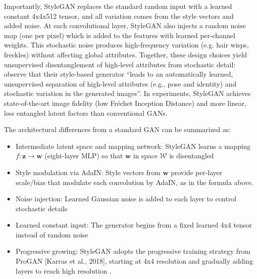 Importantly, StyleGAN replaces the standard random input with a learned constant 4x4x512 tensor, and all variation comes from the style vectors and added noise. 
At each convolutional layer, StyleGAN also injects a random noise map (one per pixel) which is added to the features with learned per-channel weights.
This stochastic noise produces high-frequency variation (e.g. hair wisps, freckles) without affecting global attributes. 
Together, these design choices yield unsupervised disentanglement of high-level attributes from stochastic detail: \citet{karras2019stylebasedgeneratorarchitecturegenerative} observe that their style-based generator 
“leads to an automatically learned, unsupervised separation of high-level attributes (e.g., pose and identity) and stochastic variation in the generated images”.
In experiments, StyleGAN achieves state-of-the-art image fidelity (low Fréchet Inception Distance) and more linear, less entangled latent factors than conventional GANs.


The architectural differences from a standard GAN can be summarized as:

\begin{itemize}
  \item Intermediate latent space and mapping network: StyleGAN learns a mapping $f: \mathbf{z}\to \mathbf{w}$ (eight-layer MLP) so that $\mathbf{w}$ in space $\mathcal{W}$ is disentangled
  \item Style modulation via AdaIN: Style vectors from $\mathbf{w}$ provide per-layer \\ scale/bias that modulate each convolution by AdaIN, as in the formula above.
  \item Noise injection: Learned Gaussian noise is added to each layer to control stochastic details
  \item Learned constant input: The generator begins from a fixed learned 4x4 tensor instead of random noise
  \item Progressive growing: StyleGAN adopts the progressive training strategy from ProGAN [Karras et al., 2018], starting at 4x4 resolution and gradually adding layers to reach high resolution \citep{karras2018progressivegrowinggansimproved}.
\end{itemize}



